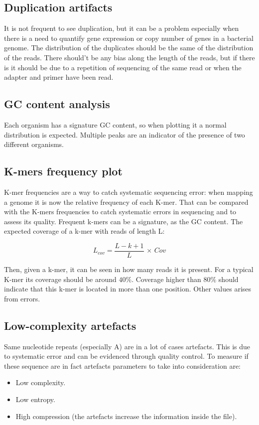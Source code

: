 	\subsection{Duplication artifacts}
	It is not frequent to see duplication, but it can be a problem especially when there is a need to quantify gene expression or copy number of genes in a bacterial genome.
	The distribution of the duplicates should be the same of the distribution of the reads.
	There should’t be any bias along the length of the reads, but if there is it should be due to a repetition of sequencing of the same read or when the adapter and primer have been read.

	\subsection{GC content analysis}
	Each organism has a signature GC content, so when plotting it a normal distribution is expected.
	Multiple peaks are an indicator of the presence of two different organisms.

	\subsection{K-mers frequency plot}
	K-mer frequencies are a way to catch systematic sequencing error: when mapping a genome it is now the relative frequency of each K-mer.
	That can be compared with the K-mers frequencies to catch systematic errors in sequencing and to assess its quality.
	Frequent k-mers can be a signature, as the GC content.
	The expected coverage of a k-mer with reads of length L:

	$$L_{cov} = \frac{L-k+1}{L} \, \times \, Cov$$

	Then, given a k-mer, it can be seen in how many reads it is present.
	For a typical K-mer its coverage should be around $40\%$.
	Coverage higher than $80\%$ should indicate that this k-mer is located in more than one position.
	Other values arises from errors.

	\subsection{Low-complexity artefacts}
	Same nucleotide repeats (especially A) are in a lot of cases artefacts.
	This is due to systematic error and can be evidenced through quality control.
	To measure if these sequence are in fact artefacts parameters to take into consideration are:

	\begin{multicols}{2}
		\begin{itemize}
			\item Low complexity.
			\item Low entropy.
			\item High compression (the artefacts increase the information inside the file).
		\end{itemize}
	\end{multicols}

